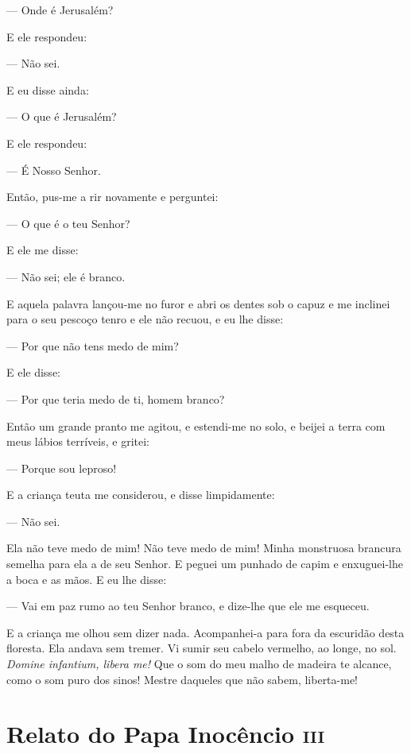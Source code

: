--- Onde é Jerusalém?

E ele respondeu:

--- Não sei.

E eu disse ainda:

--- O que é Jerusalém?

E ele respondeu:

--- É Nosso Senhor.

Então, pus-me a rir novamente e perguntei:

--- O que é o teu Senhor?

E ele me disse:

--- Não sei; ele é branco.

E aquela palavra lançou-me no furor e abri os dentes sob o capuz e me
inclinei para o seu pescoço tenro e ele não recuou, e eu lhe disse:

--- Por que não tens medo de mim?

E ele disse:

--- Por que teria medo de ti, homem branco?

Então um grande pranto me agitou, e estendi-me no solo, e beijei a terra
com meus lábios terríveis, e gritei:

--- Porque sou leproso!

E a criança teuta me considerou, e disse limpidamente:

--- Não sei.

Ela não teve medo de mim! Não teve medo de mim! Minha monstruosa brancura
semelha para ela a de seu Senhor. E peguei um punhado de capim e
enxuguei-lhe a boca e as mãos. E eu lhe disse:

--- Vai em paz rumo ao teu Senhor branco, e dize-lhe que ele me esqueceu.

E a criança me olhou sem dizer nada. Acompanhei-a para fora da escuridão
desta floresta. Ela andava sem tremer. Vi sumir seu cabelo vermelho, ao
longe, no sol. \textit{Domine infantium, libera me!}  Que o som
do meu malho de madeira te alcance, como o som puro dos sinos! Mestre
daqueles que não sabem, liberta-me!

\chapter{Relato do Papa Inocêncio \textsc{iii}}

